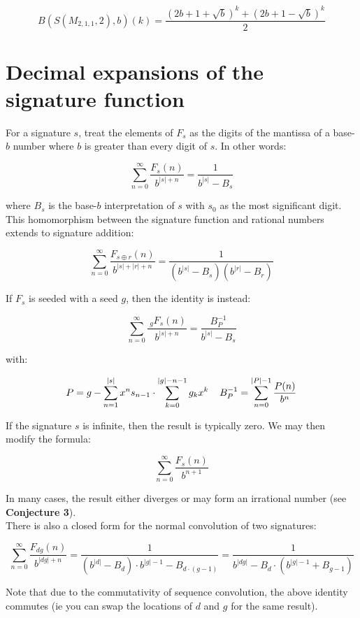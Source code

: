 \documentclass{article}
\begin{document}
$$B(S(M_{2,1,1}, 2), b)(k) = \frac{(2b + 1 + \sqrt{b})^k + (2b + 1 - \sqrt{b})^k}{2}$$
\fi

\section{Decimal expansions of the signature function}

For a signature $s$, treat the elements of $F_s$ as the digits of the mantissa of a base-$b$ number where $b$ is greater than every digit of $s$. In other words:

$$\sum_{n=0}^{\infty} \frac{F_s(n)}{b^{|s| + n}} = \frac{1}{b^{|s|} - B_s}$$

\noindent where $B_s$ is the base-$b$ interpretation of $s$ with $s_0$ as the most significant digit. This homomorphism between the signature function and rational numbers extends to signature addition:

$$\sum_{n=0}^{\infty} \frac{F_{s \oplus r}(n)}{b^{|s| + |r| + n}} = \frac{1}{(b^{|s|} - B_s)(b^{|r|} - B_r)}$$

\noindent If $F_s$ is seeded with a seed $g$, then the identity is instead:

$$\sum_{n=0}^{\infty} \frac{~_g F_s(n)}{b^{|s| + n}} = \frac{B_P^{-1}}{b^{|s|} - B_s}$$

\noindent with:

$$P = g - \sum_{n=1}^{|s|} x^n s_{n-1} \cdot \sum_{k=0}^{|g|-n-1} g_k x^k \hspace{4mm} B_P^{-1} = \sum_{n=0}^{|P|-1} \frac{P(n)}{b^n}$$

\noindent If the signature $s$ is infinite, then the result is typically zero. We may then modify the formula:

$$\sum_{n=0}^{\infty} \frac{F_{s}(n)}{b^{n+1}}$$

\noindent In many cases, the result either diverges or may form an irrational number (see \textbf{Conjecture 3}).\\

\noindent There is also a closed form for the normal convolution of two signatures:

$$\sum_{n=0}^{\infty} \frac{F_{dg}(n)}{b^{|dg| + n}} = \frac{1}{(b^{|d|} - B_d) \cdot b^{|g|-1} - B_{d \cdot (g-1)}} = \frac{1}{b^{|dg|} - B_d \cdot (b^{|g|-1} + B_{g-1})}$$

\noindent Note that due to the commutativity of sequence convolution, the above identity commutes (ie you can swap the locations of $d$ and $g$ for the same result).
\end{document}
